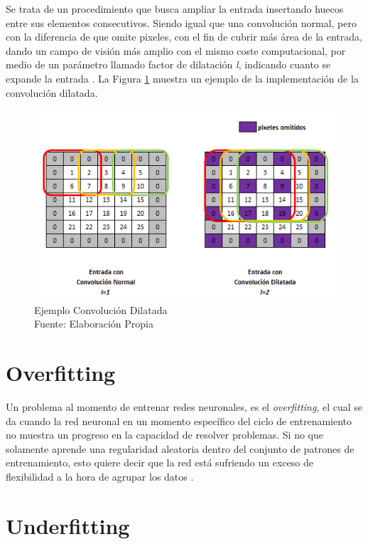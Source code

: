 Se trata de un procedimiento que busca ampliar la entrada insertando huecos entre sus elementos consecutivos. Siendo igual que una convolución normal, pero con la diferencia de que omite pixeles, con el fin de cubrir más área de la entrada, dando un campo de visión más amplio con el mismo coste computacional, por medio de un parámetro llamado factor de dilatación \textit{l}, indicando cuanto se expande la entrada \cite{prakharr0y}. La Figura \ref{fig:cd} muestra un ejemplo de la implementación de la convolución dilatada.

\begin{figure}[ht]
	\centering
	\includegraphics[scale=0.6]{Figs/Convolucion_dilatada.png}
	\caption{Ejemplo Convolución Dilatada \\Fuente: Elaboración Propia}
	\label{fig:cd}
\end{figure}

\section{Overfitting}

Un problema al momento de entrenar redes neuronales, es el \textit{overfitting}, el cual se da cuando la red neuronal en un momento específico del ciclo de entrenamiento no muestra un progreso en la capacidad de resolver problemas. Si no que solamente aprende una regularidad aleatoria dentro del conjunto de patrones de entrenamiento, esto quiere decir que la red está sufriendo un exceso de flexibilidad a la hora de agrupar los datos \cite{jabbar2015methods}.

\section{Underfitting}

